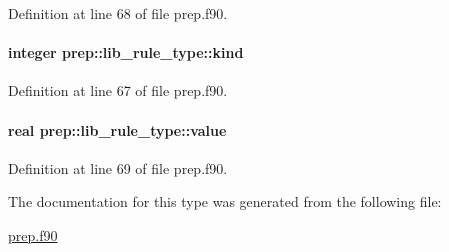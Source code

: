 Definition at line 68 of file prep.\-f90.

\hypertarget{structprep_1_1lib__rule__type_ae971ce34e2a5ae364117a1bba8c5c1e6}{
\paragraph[{kind}]{\setlength{\rightskip}{0pt plus 5cm}integer prep\-::lib\-\_\-rule\-\_\-type\-::kind}}\label{structprep_1_1lib__rule__type_ae971ce34e2a5ae364117a1bba8c5c1e6}


Definition at line 67 of file prep.\-f90.

\hypertarget{structprep_1_1lib__rule__type_a6777057a9b54bda281bef26856e1f443}{
\paragraph[{value}]{\setlength{\rightskip}{0pt plus 5cm}real prep\-::lib\-\_\-rule\-\_\-type\-::value}}\label{structprep_1_1lib__rule__type_a6777057a9b54bda281bef26856e1f443}


Definition at line 69 of file prep.\-f90.



The documentation for this type was generated from the following file\-:\begin{DoxyCompactItemize}
\item 
\hyperlink{prep_8f90}{prep.\-f90}\end{DoxyCompactItemize}
